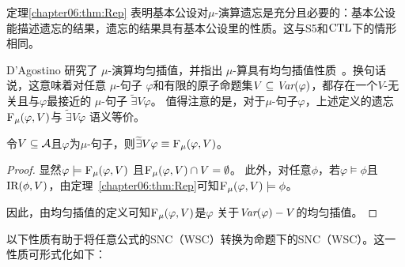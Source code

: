 定理\ref{chapter06:thm:Rep} 表明基本公设对$\mu$-演算遗忘是充分且必要的：基本公设能描述遗忘的结果，遗忘的结果具有基本公设里的性质。这与S5和$\textrm{CTL}$下的情形相同。

D'Agostino 研究了 $\mu$-演算均匀插值，并指出 $\mu$-算具有均匀插值性质~\cite{d1996uniform,d2000logical,d2006modal}。换句话说，这意味着对任意 $\mu$-句子 $\varphi$和有限的原子命题集$V\subseteq \textit{Var}(\varphi)$，都存在一个$V$-无关且与$\varphi$最接近的 $\mu$-句子 $\widetilde{\exists}V \varphi$。
值得注意的是，对于$\mu$-句子$\varphi$，上述定义的遗忘 ${\textsc{F}_{\textsc{$\mu$}}}(\varphi, V)$与 $\widetilde{\exists}V \varphi$\cite{d2006modal} 语义等价。

\begin{corollary}\label{cor:unifeqforget}
	令$V \subseteq {\cal A}$且$\varphi$为$\mu$-句子，则$\widetilde{\exists}V \varphi \equiv {\textsc{F}_{\textsc{$\mu$}}}(\varphi, V)$。
\end{corollary}
\begin{proof}
	显然$\varphi \models {\textsc{F}_{\textsc{$\mu$}}}(\varphi, V)$ 且${\textsc{F}_{\textsc{$\mu$}}}(\varphi, V) \cap V = \emptyset$。
	此外，对任意$\phi$，若$\varphi \models \phi$且$\textrm{IR}(\phi, V)$，由定理~\ref{chapter06:thm:Rep}可知${\textsc{F}_{\textsc{$\mu$}}}(\varphi, V) \models \phi$。 
	
	因此，由均匀插值的定义可知${\textsc{F}_{\textsc{$\mu$}}}(\varphi, V)$是$\varphi$ 关于$\textit{Var}(\varphi)-V$的均匀插值。 
\end{proof}

以下性质有助于将任意公式的SNC（WSC）转换为命题下的SNC（WSC）。这一性质可形式化如下：


